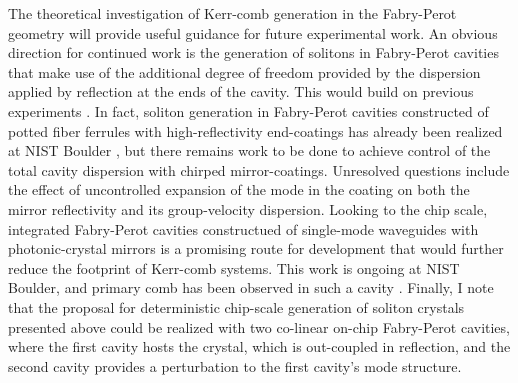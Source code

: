 The theoretical investigation of Kerr-comb generation in the Fabry-Perot geometry will provide useful guidance for future experimental work. An obvious direction for continued work is the generation of solitons in Fabry-Perot cavities that make use of the additional degree of freedom provided by the dispersion applied by reflection at the ends of the cavity. This would build on previous experiments \cite{Braje2009,Obrzud2017}. In fact, soliton generation in Fabry-Perot cavities constructed of potted fiber ferrules with high-reflectivity end-coatings has already been realized at NIST Boulder \cite{Zhang2018}, but there remains work to be done to achieve control of the total cavity dispersion with chirped mirror-coatings. Unresolved questions include the effect of uncontrolled expansion of the mode in the coating on both the mirror reflectivity and its group-velocity dispersion. Looking to the chip scale, integrated Fabry-Perot cavities constructued of single-mode waveguides with photonic-crystal mirrors is a promising route for development that would further reduce the footprint of Kerr-comb systems. This work is ongoing at NIST Boulder, and primary comb has been observed in such a cavity \cite{Yu2018}. Finally, I note that the proposal for deterministic chip-scale generation of soliton crystals presented above could be realized with two co-linear on-chip Fabry-Perot cavities, where the first cavity hosts the crystal, which is out-coupled in reflection, and the second cavity provides a perturbation to the first cavity's mode structure.







